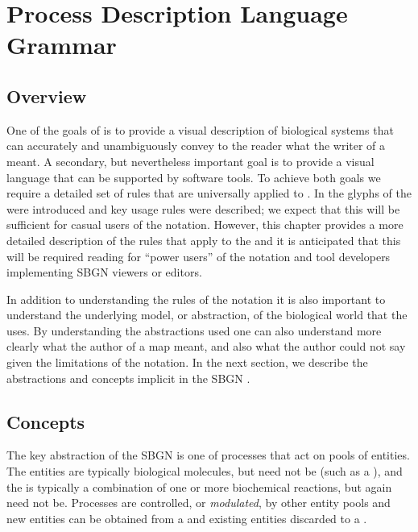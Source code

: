 \chapter{Process Description Language Grammar}
\label{chp:grammar}

\section{Overview}

One of the goals of \SBGNPDLone is to provide a visual description of biological systems that can accurately and unambiguously  convey to the reader what the writer of a \PDm meant. A secondary, but nevertheless important goal is to provide a visual language that can be supported by software tools. To achieve both goals we require a detailed set of rules that are universally applied to \PDms. In  the glyphs of the \PDl were introduced and key usage rules were described; we expect that this will be sufficient for casual users of the notation. However, this chapter provides a more detailed description of the rules that apply to the \PDl and it is anticipated that this will be required reading for ``power users'' of the notation and tool developers implementing SBGN \PD viewers or editors.

In addition to understanding the rules of the notation it is also important to understand the underlying model, or abstraction, of the biological world that the \PDl uses. By understanding the abstractions used one can also understand more clearly what the author of a map meant, and also what the author could not say given the limitations of the notation. In the next section, we describe the abstractions and concepts implicit in the SBGN \PDl.

\section{Concepts}
\label{sec:concepts}

The key abstraction of the SBGN \PDl is one of processes that act on pools of entities. The entities are typically biological molecules, but need not be (such as a ), and the  is typically a combination of one or more  biochemical reactions, but again need not be. Processes are controlled, or \emph{modulated}, by other entity pools and new entities can be obtained from a  and existing entities discarded to a .

